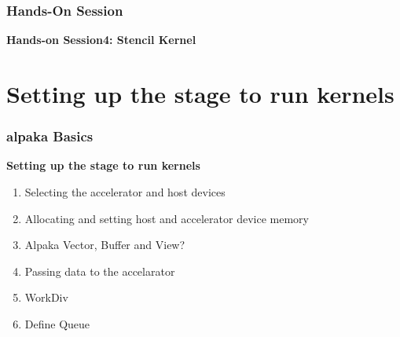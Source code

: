 \documentclass[9pt]{beamer}
\begin{document}



\begin{frame}
\frametitle{Hands-On Session}
\begin{center}
      \Huge \textbf{Hands-on Session4: Stencil Kernel}
  \end{center}
\end{frame}

\section{Setting up the stage to run kernels}

\begin{frame}
\frametitle{alpaka Basics }
\begin{center}
      \Huge \textbf{Setting up the stage to run kernels}
  \end{center}
\begin{enumerate}
 \item Selecting the accelerator and host devices
 \item Allocating and setting host and accelerator device memory
 \item Alpaka Vector, Buffer and View?
 \item Passing data to the accelarator
 \item WorkDiv
 \item Define Queue
\end{enumerate}
    \end{frame}
\end{document}
